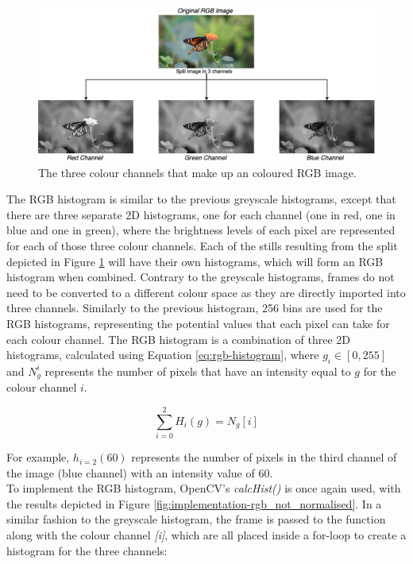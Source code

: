 \begin{figure}[h] 
\centerline{\includegraphics[width=\textwidth]{figures/implementation/rgb_image_channel_split.png}}
\caption{\label{fig:implementation-rgb_image_channel_split}The three colour channels that make up an coloured RGB image.}
\end{figure}

The RGB histogram is similar to the previous greyscale histograms, except that there are three separate 2D histograms, one for each channel (one in red, one in blue and one in green), where the brightness levels of each pixel are represented for each of those three colour channels. Each of the stills resulting from the split depicted in Figure \ref{fig:implementation-rgb_image_channel_split} will have their own histograms, which will form an RGB histogram when combined. Contrary to the greyscale histograms, frames do not need to be converted to a different colour space as they are directly imported into three channels. Similarly to the previous histogram, 256 bins are used for the RGB histograms, representing the potential values that each pixel can take for each colour channel. The RGB histogram is a combination of three 2D histograms, calculated using Equation \ref{eq:rgb-histogram}, where $g_i\in [0, 255]$ and $N_g^i$ represents the number of pixels that have an intensity equal to $g$ for the colour channel $i$. 

\begin{equation}
\label{eq:rgb-histogram}
    \sum_{i=0}^{2} H_i(g)=N_g[i]
\end{equation}

For example, $h_{i=2}(60)$ represents the number of pixels in the third channel of the image (blue channel) with an intensity value of 60.\\

To implement the RGB histogram, OpenCV's \textit{calcHist()} is once again used, with the results depicted in Figure \ref{fig:implementation-rgb_not_normalised}. In a similar fashion to the greyscale histogram, the frame is passed to the function along with the colour channel \textit{[i]}, which are all placed inside a for-loop to create a histogram for the three channels:

